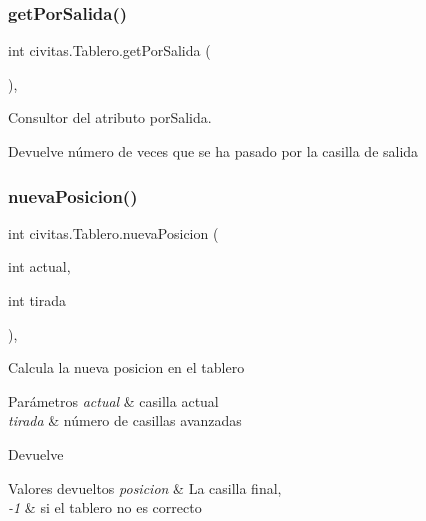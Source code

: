 \subsubsection{\texorpdfstring{get\+Por\+Salida()}{getPorSalida()}}
{\footnotesize\ttfamily int civitas.\+Tablero.\+get\+Por\+Salida (\begin{DoxyParamCaption}{ }\end{DoxyParamCaption})\hspace{0.3cm}{\ttfamily [inline]}, {\ttfamily [package]}}

Consultor del atributo por\+Salida. \begin{DoxyReturn}{Devuelve}
número de veces que se ha pasado por la casilla de salida 
\end{DoxyReturn}
\mbox{\label{classcivitas_1_1Tablero_a7eb232ed041b08dcbf44ce53ae0acc64}} 
\subsubsection{\texorpdfstring{nueva\+Posicion()}{nuevaPosicion()}}
{\footnotesize\ttfamily int civitas.\+Tablero.\+nueva\+Posicion (\begin{DoxyParamCaption}\item[{int}]{actual,  }\item[{int}]{tirada }\end{DoxyParamCaption})\hspace{0.3cm}{\ttfamily [inline]}, {\ttfamily [package]}}

Calcula la nueva posicion en el tablero 
\begin{DoxyParams}{Parámetros}
{\em actual} & casilla actual \\
\hline
{\em tirada} & número de casillas avanzadas \\
\hline
\end{DoxyParams}
\begin{DoxyReturn}{Devuelve}

\end{DoxyReturn}

\begin{DoxyRetVals}{Valores devueltos}
{\em posicion} & La casilla final, \\
\hline
{\em -\/1} & si el tablero no es correcto \\
\hline
\end{DoxyRetVals}


